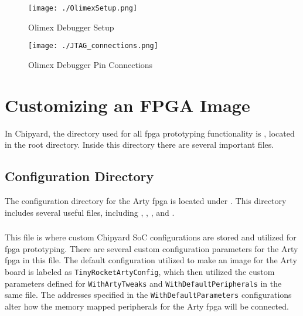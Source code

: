 \begin{figure}[h!tbp]
  \centering
  \texttt{[image: ./OlimexSetup.png]}
  \caption{Olimex Debugger Setup~\cite[p.~5]{FreedomDevGuide}}
  \label{fig:olimexsetup}
\end{figure}

\begin{figure}
	\centering
	\texttt{[image: ./JTAG\_connections.png]}
	\caption{Olimex Debugger Pin Connections~\cite[p.~4]{FreedomDevGuide}}
	\label{fig:olimexpins}
\end{figure}

\section{Customizing an FPGA Image}\label{sec:Customizing}
In Chipyard, the directory used for all \Gls{fpga} prototyping functionality is , located in the root directory.
Inside this directory there are several important files.


\subsection{Configuration Directory}\label{sec:Customizing_FPGA-Config_Directory}
The configuration directory for the Arty \Gls{fpga} is located under .
This directory includes several useful files, including , , , and .

\subsubsection{}\label{sec:Customizing_FPGA-Configs.scala}
This file is where custom Chipyard SoC configurations are stored and utilized for \Gls{fpga} prototyping.
There are several custom configuration parameters for the Arty \Gls{fpga} in this file.
The default configuration utilized to make an image for the Arty board is labeled as \texttt{TinyRocketArtyConfig}, which then utilized the custom parameters defined for \texttt{WithArtyTweaks} and \texttt{WithDefaultPeripherals} in the same file.
The addresses specified in the \texttt{WithDefaultParameters} configurations alter how the memory mapped peripherals for the Arty \Gls{fpga} will be connected.

